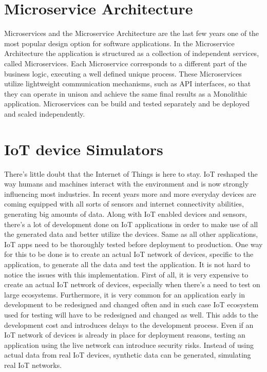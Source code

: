 \documentclass{article}
\begin{document}
\section{Microservice Architecture}

Microservices and the Microservice Architecture are the last few years one of the most popular design option for software applications. In the Microservice Architecture the application is structured as a collection of independent services, called Microservices. Each Microservice corresponds to a different part of the business logic, executing a well defined unique process\cite{monovsmicro}\cite{microservicesdef}. These Microservices utilize lightweight communication mechanisms, such as API interfaces, so that they can operate in unison and achieve the same final results as a Monolithic application. Microservices can be build and tested separately and be deployed and scaled independently. 

\section{IoT device Simulators}
There's little doubt that the Internet of Things is here to stay. IoT reshaped the way humans and machines interact with the environment and is now strongly influencing most industries. In recent years more and more everyday devices are coming equipped with all sorts of sensors and internet connectivity abilities, generating big amounts of data. Along with IoT enabled devices and sensors, there's a lot of development done on IoT applications in order to make use of all the generated data and better utilize the devices. Same as all other applications, IoT apps need to be thoroughly tested before deployment to production. One way for this to be done is to create an actual IoT network of devices, specific to the application, to generate all the data and test the application. It is not hard to notice the issues with this implementation. First of all, it is very expensive to create an actual IoT network of devices, especially when there's a need to test on large ecosystems. Furthermore, it is very common for an application early in development to be redesigned and changed often and in such case IoT ecosystem used for testing will have to be redesigned and changed as well. This adds to the development cost and introduces delays to the development process. Even if an IoT network of devices is already in place for deployment reasons, testing an application using the live network can introduce security risks. Instead of using actual data from real IoT devices, synthetic data can be generated, simulating real IoT networks. 


\end{document}
